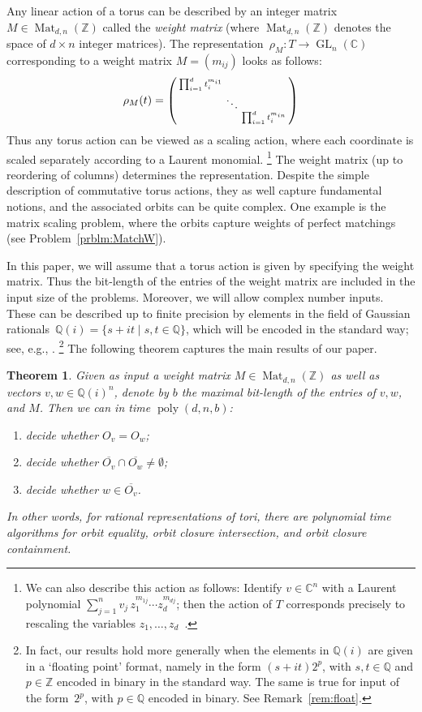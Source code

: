 \documentclass[10pt,a4paper]{article}
\DeclareMathOperator{\GL}{GL}
\DeclareMathOperator{\poly}{poly}
\DeclareMathOperator{\Mat}{Mat}
\newtheorem{theorem}{Theorem}[section]
\theoremstyle{definition}
\numberwithin{equation}{section}
\newcommand{\QQ}{\mathbb{Q}}
\newcommand{\CC}{\mathbb{C}}
\newcommand{\ZZ}{\mathbb{Z}}
\begin{document}
Any linear action of a torus can be described by an integer matrix $M \in \Mat_{d,n}(\ZZ)$ called the \emph{weight matrix}
(where $\Mat_{d,n}(\ZZ)$ denotes the space of $d \times n$ integer matrices).
The representation~$\rho_M \colon T \rightarrow \GL_n(\CC)$ corresponding to a weight matrix $M=(m_{ij})$ looks as follows:
\begin{align}\label{eq:toract}
  \rho_M(t) = \begin{psmallmatrix} \prod_{i=1}^d t_i^{m_{i1}} & & \\ & \ddots & \\ & & \prod_{i=1}^d t_i^{m_{in}} \end{psmallmatrix}
\end{align}
Thus any torus action can be viewed as a scaling action, where each coordinate is scaled separately according to a Laurent monomial.
\footnote{
We can also describe this action as follows:
Identify $v\in\CC^n$ with a Laurent polynomial $\sum_{j=1}^n v_j \, z_1^{m_{1j}} \cdots z_d^{m_{dj}}$;
then the action of $T$ corresponds precisely to rescaling the variables $z_1,\dots,z_d$~\cite{gurvits2004combinatorial}.}
The weight matrix (up to reordering of columns) determines the representation. 
%
Despite the simple description of commutative torus actions, they as well capture fundamental notions, and the associated orbits can be quite complex.
One example is the matrix scaling problem, where the orbits capture weights of perfect matchings (see Problem~\ref{prblm:MatchW}).
%

In this paper, we will assume that a torus action is given by specifying the weight matrix.
Thus the bit-length of the entries of the weight matrix are included in the input size of the problems.
Moreover, we will allow complex number inputs.
These can be described up to finite precision by elements in the field of Gaussian rationals~$\QQ(i) = \{ s + i t \;|\; s,t \in \QQ \}$,
which will be encoded in the standard way; see, e.g., \cite{GCTV}.
\footnote{In fact, our results hold more generally when the elements in $\QQ(i)$ are given in a `floating point' format, namely in the form $(s + it) 2^p$, with $s,t\in\QQ$ and $p\in\ZZ$ encoded in binary in the standard way. The same is true for input of the form~$2^p$, with $p\in\QQ$ encoded in binary. See Remark~\ref{rem:float}.\label{foot:float}}
The following theorem captures the main results of our paper.


\begin{theorem}\label{thm:main}
Given as input a weight matrix $M \in\Mat_{d,n}(\ZZ)$ as well as vectors $v,w \in \QQ(i)^n$, denote by $b$ the maximal bit-length of the entries of $v,w$, and $M$.
Then we can in time $\poly(d,n,b)$:
\begin{enumerate}
\item decide whether $O_v = O_w$;
\item decide whether $\overline{O_v} \cap \overline{O_w} \ne \emptyset$;
\item decide whether $w \in \overline{O_v}$.
\end{enumerate}
In other words, for rational representations of tori, there are polynomial time algorithms for orbit equality, orbit closure intersection, and orbit closure containment.
\end{theorem}
\end{document}
